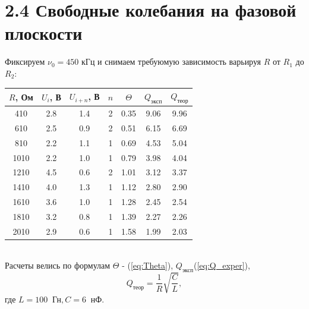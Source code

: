\documentclass[a4paper,12pt]{extarticle}
\begin{document}
\section*{2.4 Свободные колебания на фазовой плоскости}
Фиксируем $\nu_0 = 450$ кГц и снимаем требуюмую зависимость варьируя $R$ от $R_1$ до $R_2$: \\
\begin{tabular}{|c|c|c|c|c|c|c|}
\hline
$R$, Ом    & $U_i$, В     & $U_{i+n}$, В    & $n$ & $\Theta$ & $Q_{\text{эксп}}$ & $Q_{\text{теор}}$    \\ \hline
410  & 2.8 & 1.4 & 2 & 0.35 & 9.06 & 9.96                   \\ \hline
610  & 2.5 & 0.9 & 2 & 0.51 & 6.15 & 6.69                   \\ \hline
810  & 2.2 & 1.1 & 1 & 0.69 & 4.53 & 5.04                   \\ \hline
1010 & 2.2 & 1.0 & 1 & 0.79 & 3.98 & 4.04                   \\ \hline
1210 & 4.5 & 0.6 & 2 & 1.01 & 3.12 & 3.37                   \\ \hline
1410 & 4.0 & 1.3 & 1 & 1.12 & 2.80 & 2.90                   \\ \hline
1610 & 3.6 & 1.0 & 1 & 1.28 & 2.45 & 2.54                   \\ \hline
1810 & 3.2 & 0.8 & 1 & 1.39 & 2.27 & 2.26                   \\ \hline
2010 & 2.9 & 0.6 & 1 & 1.58 & 1.99 & 2.03                   \\ \hline
\end{tabular}\\
Расчеты велись по формулам $\Theta$ - (\ref{eq:Theta}), $Q_{\text{эксп}}$(\ref{eq:Q_exper}),
\begin{equation}
    Q_{\text{теор}} = \frac{1}{R} \sqrt{\frac{C}{L}},
    \label{eq:Q_teor}
\end{equation}
где $L = 100\;\;\text{Гн}, C = 6\;\;\text{нФ}$.
\end{document}
